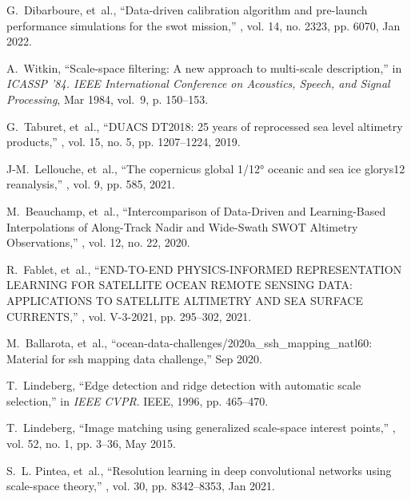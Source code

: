 \begin{bibunit}
\begin{thebibliography}{10}
G.~Dibarboure, et~al.,
\newblock ``Data-driven calibration algorithm and pre-launch performance
  simulations for the swot mission,''
, vol. 14, no. 2323, pp. 6070, Jan 2022.

A.~Witkin,
\newblock ``Scale-space filtering: A new approach to multi-scale description,''
\newblock in {\em ICASSP ’84. IEEE International Conference on Acoustics,
  Speech, and Signal Processing}, Mar 1984, vol.~9, p. 150–153.

G.~Taburet, et~al.,
\newblock ``{DUACS} {DT2018}: 25 years of reprocessed sea level altimetry
  products,''
, vol. 15, no. 5, pp. 1207--1224, 2019.

J-M.~Lellouche, et~al.,
\newblock ``The copernicus global 1/12° oceanic and sea ice glorys12
  reanalysis,''
, vol. 9, pp. 585, 2021.

M.~Beauchamp, et~al.,
\newblock ``Intercomparison of {Data}-{Driven} and {Learning}-{Based}
  {Interpolations} of {Along}-{Track} {Nadir} and {Wide}-{Swath} {SWOT}
  {Altimetry} {Observations},''
, vol. 12, no. 22, 2020.

R.~Fablet, et~al.,
\newblock ``{END}-{TO}-{END} {PHYSICS}-{INFORMED} {REPRESENTATION} {LEARNING}
  {FOR} {SATELLITE} {OCEAN} {REMOTE} {SENSING} {DATA}: {APPLICATIONS} {TO}
  {SATELLITE} {ALTIMETRY} {AND} {SEA} {SURFACE} {CURRENTS},''
, vol. V-3-2021, pp. 295--302, 2021.

M.~Ballarota, et~al.,
\newblock ``ocean-data-challenges/2020a\_ssh\_mapping\_natl60: Material for ssh
  mapping data challenge,'' Sep 2020.

T.~Lindeberg,
\newblock ``Edge detection and ridge detection with automatic scale
  selection,''
\newblock in {\em IEEE CVPR}. IEEE, 1996, pp. 465--470.

T.~Lindeberg,
\newblock ``Image matching using generalized scale-space interest points,''
, vol. 52, no. 1, pp.
  3–36, May 2015.

S.~L. Pintea, et~al.,
\newblock ``Resolution learning in deep convolutional networks using
  scale-space theory,''
, vol. 30, pp.
  8342–8353, Jan 2021.


\end{thebibliography}
\end{bibunit}
